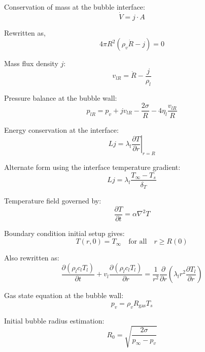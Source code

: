 \documentclass[aps,pre,twocolumn,superscriptaddress,floatfix]{revtex4-2}
\begin{document}
Conservation of mass at the bubble interface:
\begin{equation}
\dot{V} = j \cdot A
\end{equation}

Rewritten as,
\begin{equation}
4 \pi R^2 (\rho_v \dot{R} - j) = 0
\end{equation}

Mass flux density $j$:
\begin{equation}
v_{lR} = \dot{R} - \frac{j}{\rho_l}
\end{equation}

Pressure balance at the bubble wall:
\begin{equation}
p_{lR} = p_v + j v_{lR} - \frac{2\sigma}{R} - 4 \eta_l \frac{v_{lR}}{R}
\end{equation}

Energy conservation at the interface:
\begin{equation}
L j = \lambda_l \left. \frac{\partial T}{\partial r} \right|_{r=R}
\end{equation}

Alternate form using the interface temperature gradient:
\begin{equation}
L j = \lambda_l \frac{T_{\infty} - T_s}{\delta_T}
\end{equation}

Temperature field governed by:
\begin{equation}
\frac{\partial T}{\partial t} = \alpha \nabla^2 T
\end{equation}

Boundary condition initial setup gives:
\begin{equation}
T(r,0) = T_{\infty} \quad \text{for all} \quad r \geq R(0)
\end{equation}

Also rewritten as:
\begin{equation}
\frac{\partial (\rho_l c_l T_l)}{\partial t}
+ v_l \frac{\partial (\rho_l c_l T_l)}{\partial r}
= \frac{1}{r^2} \frac{\partial}{\partial r} \left( \lambda_l r^2 \frac{\partial T_l}{\partial r} \right)
\end{equation}

Gas state equation at the bubble wall:
\begin{equation}
p_v = \rho_v R_{\text{gas}} T_s
\end{equation}

Initial bubble radius estimation:
\begin{equation}
R_0 = \sqrt{ \frac{2\sigma}{p_{\infty} - p_v} }
\end{equation}
\end{document}
